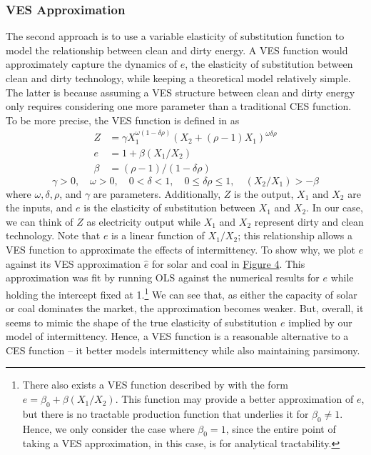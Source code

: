\documentclass[11pt,a4paper]{extarticle}
\begin{document}
\subsubsection{VES Approximation}

The second approach is to use a variable elasticity of substitution function to model the relationship between clean and dirty energy.  A VES function would approximately capture the dynamics of $e$, the elasticity of substitution between clean and dirty technology,  while keeping a theoretical model relatively simple. The latter is because assuming a VES structure between clean and dirty energy only requires considering one more parameter than a traditional CES function. To be more precise, the VES function is defined in \citet{VES} as
\begin{align}
Z &= \gamma X_1^{\omega(1-\delta \rho)} \left( X_2 + (\rho - 1) X_1 \right)^{\omega \delta \rho} \\
e &= 1 + \beta (X_1 / X_2) \\
\beta &= (\rho - 1) / ( 1- \delta \rho ) 
\end{align}
\vspace{-4ex}
$$\gamma > 0, \quad \omega > 0, \quad0 < \delta < 1, \quad 0 \leq \delta \rho \leq 1 , \quad (X_2/X_1) >  -\beta $$
where $\omega, \delta, \rho$, and $\gamma$ are parameters. Additionally, $Z$ is the output, $X_1$ and $X_2$ are the inputs, and $e$ is the elasticity of substitution between $X_1$ and $X_2$. In our case, we can think of $Z$ as electricity output while $X_1$ and $X_2$ represent dirty and clean technology. Note that $e$ is a linear function of $X_1/X_2$; this relationship allows a VES function to approximate the effects of intermittency. To show why, we plot $e$ against its VES approximation $\hat{e}$ for solar and coal in \hyperref[fig:ves]{Figure 4}. This approximation was fit by running OLS against the numerical results for $e$ while holding the intercept fixed at 1.\footnote{ There also exists a VES function described by \citet{VES} with the form $e = \beta_0 + \beta (X_1/X_2)$. This function may provide a better approximation of $e$, but there is no tractable production function that underlies it for $\beta_0 \neq 1$. Hence, we only consider the case where $\beta_0 = 1$, since the entire point of taking a VES approximation, in this case, is for analytical tractability. } We can see that, as either the capacity of solar or coal dominates the market, the approximation becomes weaker. But, overall, it seems to mimic the shape of the true elasticity of substitution $e$ implied by our model of intermittency. Hence, a  VES function is a reasonable alternative to a CES function -- it better models intermittency while also maintaining parsimony. 
\end{document}
